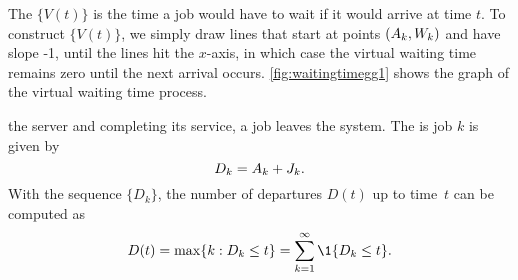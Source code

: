 

The  $\{V(t)\}$ is the time a job would have to wait if it would arrive at time $t$.
To construct $\{V(t)\}$, we simply draw lines that start at points $(A_k, W_k)$ and have slope -1, until the lines hit the $x$-axis, in which case the virtual waiting time remains zero until the next arrival occurs. \cref{fig:waitingtimegg1} shows the graph of the virtual waiting time process.

 the server and completing its service, a job leaves the system.
The  is job $k$ is given by
\begin{equation*}
 D_k = A_{k} + J_k.
\end{equation*}
With the sequence $\{D_k\}$, the number of departures $D(t)$ up to time~$t$ can be computed as
\begin{equation*}
 D(t) = \max\{k : D_k \leq t\} = \sum_{k=1}^\infty \1{D_k \leq t}.
\end{equation*}


